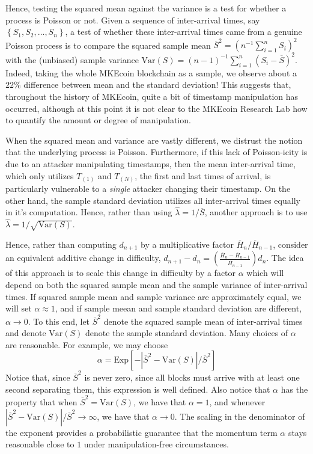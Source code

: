 \documentclass[12pt,english]{mrl}
\theoremstyle{definition}
\numberwithin{equation}{section}
\numberwithin{figure}{section}
\numberwithin{equation}{section}
\numberwithin{equation}{section}
\numberwithin{figure}{section}
\begin{document}
Hence, testing the squared mean against the variance is a test for whether a process is Poisson or not. Given a sequence of inter-arrival times, say $\left\{S_1, S_2, \ldots, S_n\right\}$, a test of whether these inter-arrival times came from a genuine Poisson process is to compare the squared sample mean $\overline{S}^2 = \left(n^{-1}\sum_{i=1}^{n} S_i\right)^2$ with the (unbiased) sample variance $\text{Var}(S) = (n-1)^{-1}\sum_{i=1}^{n} (S_i - \overline{S})^2$. Indeed, taking the whole MKEcoin blockchain as a sample, we observe about a $22\%$ difference between mean and the standard deviation! This suggests that, throughout the history of MKEcoin, quite a bit of timestamp manipulation has occurred, although at this point it is not clear to the MKEcoin Research Lab how to quantify the amount or degree of manipulation.

When the squared mean and variance are vastly different, we distrust the notion that the underlying process is Poisson. Furthermore, if this lack of Poisson-icity is due to an attacker manipulating timestamps, then the mean inter-arrival time, which only utilizes $T_{(1)}$ and $T_{(N)}$, the first and last times of arrival, is particularly vulnerable to a \textit{single} attacker changing their timestamp. On the other hand, the sample standard deviation utilizes all inter-arrival times equally in it's computation. Hence, rather than using $\hat{\lambda} = 1/\overline{S}$, another approach is to use $\hat{\lambda} = 1/\sqrt{\text{Var}(S)}$.

Hence, rather than computing $d_{n+1}$ by a multiplicative factor $\overline{H}_n/\overline{H}_{n-1}$, consider an equivalent additive change in difficulty, $d_{n+1} - d_n = (\frac{\overline{H}_n - \overline{H}_{n-1}}{\overline{H}_{n-1}})d_n$. The idea of this approach is to scale  this change in difficulty by a factor $\alpha$ which will depend on both the squared sample mean and the sample variance of inter-arrival times. If squared sample mean and sample variance are approximately equal, we will set $\alpha \approx 1$, and if sample meean and sample standard deviation are different, $\alpha \to 0$. To this end, let $\overline{S}^2$ denote the squared sample mean of inter-arrival times and denote $\text{Var}(S)$ denote the sample standard deviation. Many choices of $\alpha$ are reasonable. For example, we may choose
\[\alpha = \text{Exp}\left[-\left|\overline{S}^2-\text{Var}(S)\right|/\overline{S}^2\right]\]
Notice that, since $\overline{S}^2$ is never zero, since all blocks must arrive with at least one second separating them, this expression is well defined. Also notice that $\alpha$ has the property that when $\overline{S}^2 = \text{Var}(S)$, we have that $\alpha = 1$, and whenever $\left|\overline{S}^2 - \text{Var}(S)\right|/\overline{S}^2 \to \infty$, we have that $\alpha \to 0$. The scaling in the denominator of the exponent provides a probabilistic guarantee that the momentum term $\alpha$ stays reasonable close to $1$ under manipulation-free circumstances.
\end{document}
